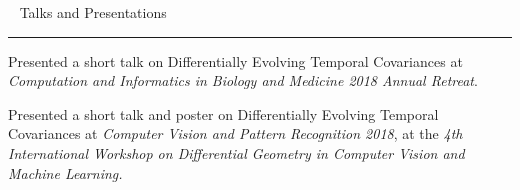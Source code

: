 \documentclass[]{article}
\begin{document}
%
%
%
%
%
%
%



\iffalse\
\vspace{20pt}
{\LARGE Talks and Presentations}
\vspace{3pt}
\hrule
\vspace{10pt}

 Presented a short talk on Differentially Evolving Temporal Covariances at \textit{Computation and Informatics in Biology and Medicine 2018 Annual Retreat}.

 Presented a short talk and poster on Differentially Evolving Temporal Covariances at \textit{Computer Vision and Pattern Recognition 2018}, at the \textit{4th International Workshop on Differential Geometry in Computer Vision and Machine Learning.}
\end{document}
